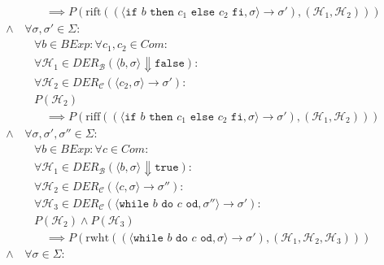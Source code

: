 \documentclass[a4paper, 11pt, accentcolor = tud3b]{tudreport}
\begin{document}
\begin{align*}
								&\quad\quad \implies P(\text{rift}((\langle \texttt{if } b \texttt{ then } c _ 1 \texttt{ else } c _ 2 \texttt{ fi}, \sigma \rangle \rightarrow \sigma'), (\mathcal{H} _ 1, \mathcal{H} _ 2))) \tag{Konklusion} \\
							\land & \,\forall \sigma, \sigma' \in \Sigma : \tag{Zustände} \\
								&\quad \forall b \in \textit{BExp} : \forall c _ 1, c _ 2 \in \textit{Com} : \tag{Ausdrucksbestandteile} \\
								&\quad \forall \mathcal{H} _ 1 \in \textit{DER} _ \mathcal{B} (\langle b, \sigma \rangle \Downarrow \texttt{false}) : \tag{Kalkülfremde Herleitungen} \\
								&\quad \forall \mathcal{H} _ 2 \in \textit{DER} _ \mathcal{C} (\langle c _ 2, \sigma \rangle \rightarrow \sigma') : \tag{Herleitungen in Prämisse} \\
								&\quad P(\mathcal{H} _ 2) \tag{Prämisse} \\
								&\quad\quad \implies P(\text{riff}((\langle \texttt{if } b \texttt{ then } c _ 1 \texttt{ else } c _ 2 \texttt{ fi}, \sigma \rangle \rightarrow \sigma'), (\mathcal{H} _ 1, \mathcal{H} _ 2))) \tag{Konklusion} \\
							\land & \,\forall \sigma, \sigma', \sigma'' \in \Sigma : \tag{Zustände} \\
								&\quad \forall b \in \textit{BExp} : \forall c \in \textit{Com} : \tag{Ausdrucksbestandteile} \\
								&\quad \forall \mathcal{H} _ 1 \in \textit{DER} _ \mathcal{B} (\langle b, \sigma \rangle \Downarrow \texttt{true}) : \tag{Kalkülfremde Herleitungen} \\
								&\quad \forall \mathcal{H} _ 2 \in \textit{DER} _ \mathcal{C} (\langle c, \sigma \rangle \rightarrow \sigma'') : \tag{Herleitungen in Prämisse} \\
								&\quad \forall \mathcal{H} _ 3 \in \textit{DER} _ \mathcal{C} (\langle \texttt{while } b \texttt{ do } c \texttt{ od}, \sigma'' \rangle \rightarrow \sigma') : \tag{Herleitungen in Prämisse} \\
								&\quad P(\mathcal{H} _ 2) \land P(\mathcal{H} _ 3) \tag{Prämisse} \\
								&\quad\quad \implies P(\text{rwht}((\langle \texttt{while } b \texttt{ do } c \texttt{ od}, \sigma \rangle \rightarrow \sigma'), (\mathcal{H} _ 1, \mathcal{H} _ 2, \mathcal{H} _ 3))) \tag{Konklusion} \\
							\land & \,\forall \sigma \in \Sigma : \tag{Zustände} \\

\end{align*}
\end{document}
